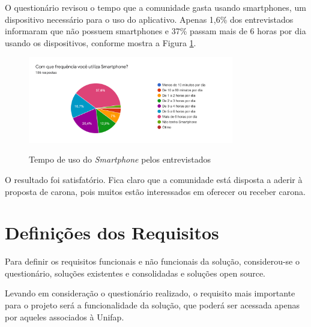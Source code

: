 O questionário revisou o tempo que a comunidade gasta usando smartphones, um dispositivo necessário para o uso do aplicativo. Apenas 1,6\% dos entrevistados informaram que não possuem smartphones e 37\% passam mais de 6 horas por dia usando os dispositivos, conforme mostra a Figura \ref{fig:usodosmartphone}.

\begin{figure}[!hbtp]
	\centering
	\caption{Tempo de uso do \textit{Smartphone} pelos entrevistados}
	\includegraphics[width=0.8\textwidth]{./04-figuras/questionario/17.png}
	\label{fig:usodosmartphone}
\end{figure}

O resultado foi satisfatório. Fica claro que a comunidade está disposta a aderir à proposta de carona, pois muitos estão interessados em oferecer ou receber carona.

\section{Definições dos Requisitos}

Para definir os requisitos funcionais e não funcionais da solução, considerou-se o questionário, soluções existentes e consolidadas e soluções open source.

Levando em consideração o questionário realizado, o requisito mais importante para o projeto será a funcionalidade da solução, que poderá ser acessada apenas por aqueles associados à Unifap.

